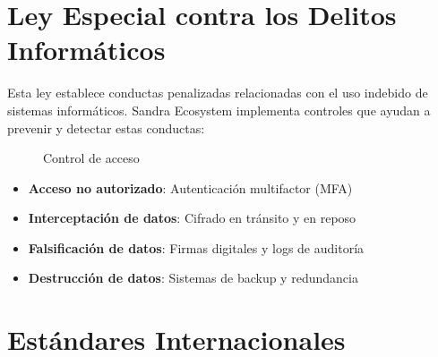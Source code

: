 \documentclass[11pt, spanish, letterpaper, twocolumn]{book}
\begin{document}
\section{Ley Especial contra los Delitos Informáticos}

Esta ley establece conductas penalizadas relacionadas con el uso indebido de sistemas informáticos. Sandra Ecosystem implementa controles que ayudan a prevenir y detectar estas conductas:

\begin{figure}
    \centering
    \caption{Control de acceso}
    \label{fig:acceso}
\end{figure}

\begin{itemize}
    \item \textbf{Acceso no autorizado}: Autenticación multifactor (MFA)
    \item \textbf{Interceptación de datos}: Cifrado en tránsito y en reposo
    \item \textbf{Falsificación de datos}: Firmas digitales y logs de auditoría
    \item \textbf{Destrucción de datos}: Sistemas de backup y redundancia
\end{itemize}

\section{Estándares Internacionales}
\end{document}
